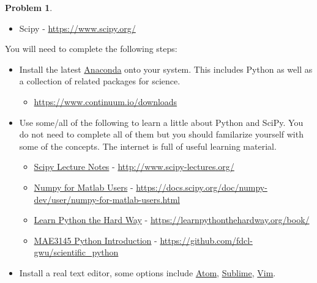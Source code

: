 \documentclass[10pt]{article}
\theoremstyle{definition}
\newtheorem{prob}{Problem}[section]
\begin{document}
\begin{prob}
\begin{itemize}
\begin{itemize}
            \item Scipy - \href{https://www.scipy.org/}{https://www.scipy.org/}
        \end{itemize}
\end{itemize}
You will need to complete the following steps: 
\begin{itemize}
    \item Install the latest \href{https://www.continuum.io/downloads}{Anaconda} onto your system. 
        This includes Python as well as a collection of related packages for science. 
        \begin{itemize}
            \item \href{https://www.continuum.io/downloads}{https://www.continuum.io/downloads}
        \end{itemize}

    \item Use some/all of the following to learn a little about Python and SciPy.
        You do not need to complete all of them but you should familarize yourself with some of the concepts. 
        The internet is full of useful learning material.
        \begin{itemize}
            \item \href{http://www.scipy-lectures.org/}{Scipy Lecture Notes} -  \href{http://www.scipy-lectures.org/}{http://www.scipy-lectures.org/}
            \item \href{https://docs.scipy.org/doc/numpy-dev/user/numpy-for-matlab-users.html}{Numpy for Matlab Users} - \href{https://docs.scipy.org/doc/numpy-dev/user/numpy-for-matlab-users.html}{https://docs.scipy.org/doc/numpy-dev/user/numpy-for-matlab-users.html}
            \item \href{https://learnpythonthehardway.org/book/}{Learn Python the Hard Way} - \href{https://learnpythonthehardway.org/book/}{https://learnpythonthehardway.org/book/}
            \item \href{https://github.com/fdcl-gwu/scientific_python}{MAE3145 Python Introduction} - \href{https://github.com/fdcl-gwu/scientific_python}{https://github.com/fdcl-gwu/scientific\_python}
        \end{itemize}
    \item Install a real text editor, some options include \href{https://atom.io/}{Atom}, \href{https://www.sublimetext.com/}{Sublime}, \href{http://www.vim.org/download.php}{Vim}.
\end{itemize}

\end{prob}
\end{document}
